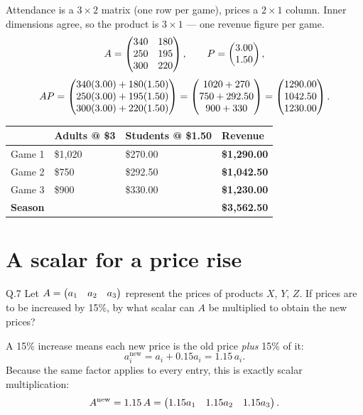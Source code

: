 \begin{solution}
Attendance is a $3\times2$ matrix (one row per game), prices a $2\times1$
column. Inner dimensions agree, so the product is $3\times1$ --- one revenue
figure per game.
\[
A=\begin{pmatrix}340&180\\250&195\\300&220\end{pmatrix},\qquad
P=\begin{pmatrix}3.00\\1.50\end{pmatrix},
\]
\[
AP=\begin{pmatrix}340(3.00)+180(1.50)\\250(3.00)+195(1.50)\\300(3.00)+220(1.50)\end{pmatrix}
=\begin{pmatrix}1020+270\\750+292.50\\900+330\end{pmatrix}
=\begin{pmatrix}1290.00\\1042.50\\1230.00\end{pmatrix}.
\]

\begin{center}
\small\sffamily
\begin{tabular}{@{}l C{2.2cm} C{2.2cm} C{2.6cm}@{}}
\toprule
 & \textbf{Adults @ \$3} & \textbf{Students @ \$1.50} & \textbf{Revenue} \\
\midrule
Game 1 & \$1{,}020 & \$270.00   & \textbf{\$1{,}290.00} \\
Game 2 & \$750     & \$292.50   & \textbf{\$1{,}042.50} \\
Game 3 & \$900     & \$330.00   & \textbf{\$1{,}230.00} \\
\midrule
\textbf{Season} & & & \textbf{\$3{,}562.50} \\
\bottomrule
\end{tabular}
\end{center}

\end{solution}

\section{A scalar for a price rise}

\begin{question}{Q.7}
Let $A=\begin{pmatrix}a_1&a_2&a_3\end{pmatrix}$ represent the prices of products $X$, $Y$, $Z$. If
prices are to be increased by 15\%, by what scalar can $A$ be multiplied to
obtain the new prices?
\end{question}

\begin{solution}
A 15\% increase means each new price is the old price \emph{plus} 15\% of it:
\[
a_i^{\text{new}}=a_i+0.15a_i=1.15\,a_i .
\]
Because the same factor applies to every entry, this is exactly scalar
multiplication:
\[
A^{\text{new}}=1.15\,A=\begin{pmatrix}1.15a_1 & 1.15a_2 & 1.15a_3\end{pmatrix}.
\]

\end{solution}

